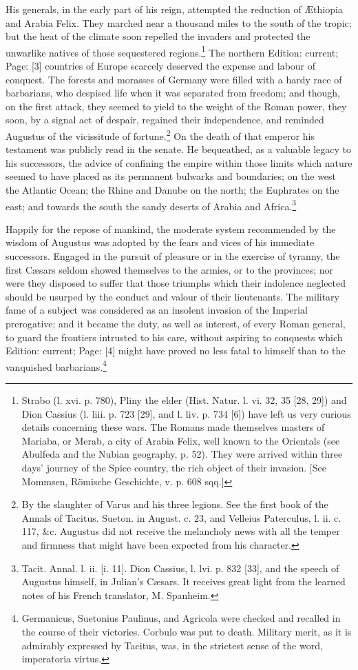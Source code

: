 His generals, in the early part of his reign, attempted the reduction of Æthiopia and Arabia Felix. They marched near a thousand miles to the south of the tropic; but the heat of the climate soon repelled the invaders and protected the unwarlike natives of those sequestered regions.\footnote{Strabo (l. xvi. p. 780), Pliny the elder (Hist. Natur. l. vi. 32, 35 [28, 29]) and Dion Cassius (l. liii. p. 723 [29], and l. liv. p. 734 [6]) have left us very curious details concerning these wars. The Romans made themselves masters of Mariaba, or Merab, a city of Arabia Felix, well known to the Orientals (see Abulfeda and the Nubian geography, p. 52). They were arrived within three days\texthebrew{}’ journey of the Spice country, the rich object of their invasion. [See Mommsen, Römische Geschichte, v. p. 608 sqq.]} The northern Edition: current; Page: [3] countries of Europe scarcely deserved the expense and labour of conquest. The forests and morasses of Germany were filled with a hardy race of barbarians, who despised life when it was separated from freedom; and though, on the first attack, they seemed to yield to the weight of the Roman power, they soon, by a signal act of despair, regained their independence, and reminded Augustus of the vicissitude of fortune.\footnote{By the slaughter of Varus and his three legions. See the first book of the Annals of Tacitus. Sueton. in August. c. 23, and Velleius Paterculus, l. ii. c. 117, \&c. Augustus did not receive the melancholy news with all the temper and firmness that might have been expected from his character.} On the death of that emperor his testament was publicly read in the senate. He bequeathed, as a valuable legacy to his successors, the advice of confining the empire within those limits which nature seemed to have placed as its permanent bulwarks and boundaries; on the west the Atlantic Ocean; the Rhine and Danube on the north; the Euphrates on the east; and towards the south the sandy deserts of Arabia and Africa.\footnote{Tacit. Annal. l. ii. [i. 11]. Dion Cassius, l. lvi. p. 832 [33], and the speech of Augustus himself, in Julian\texthebrew{}’s Cæsars. It receives great light from the learned notes of his French translator, M. Spanheim.}

Happily for the repose of mankind, the moderate system recommended by the wisdom of Augustus was adopted by the fears and vices of his immediate successors. Engaged in the pursuit of pleasure or in the exercise of tyranny, the first Cæsars seldom showed themselves to the armies, or to the provinces; nor were they disposed to suffer that those triumphs which their indolence neglected should be usurped by the conduct and valour of their lieutenants. The military fame of a subject was considered as an insolent invasion of the Imperial prerogative; and it became the duty, as well as interest, of every Roman general, to guard the frontiers intrusted to his care, without aspiring to conquests which Edition: current; Page: [4] might have proved no less fatal to himself than to the vanquished barbarians.\footnote{Germanicus, Suetonius Paulinus, and Agricola were checked and recalled in the course of their victories. Corbulo was put to death. Military merit, as it is admirably expressed by Tacitus, was, in the strictest sense of the word, imperatoria virtus.}


